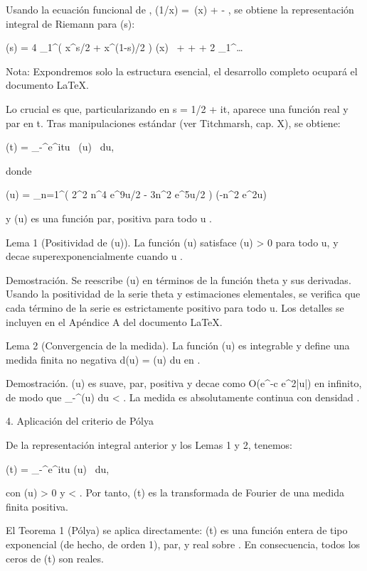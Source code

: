 \documentclass[12pt,a4paper]{book}
\begin{document}
Usando la ecuación funcional de \psi, \psi(1/x) = \,\psi(x) +  - , se obtiene la representación integral de Riemann para \xi(s):

\xi(s) = 4 \int_1^\infty \left( x^{s/2} + x^{(1-s)/2} \right) \psi(x) \,  +  +  + 2 \int_1^\infty \dots

Nota: Expondremos solo la estructura esencial, el desarrollo completo ocupará el documento LaTeX.

Lo crucial es que, particularizando en s = 1/2 + it, aparece una función real y par en t. Tras manipulaciones estándar (ver Titchmarsh, cap. X), se obtiene:

\Xi(t) =  \int_{-\infty}^\infty e^{itu} \, \Phi(u) \, du,
\]  

donde

\Phi(u) = \sum_{n=1}^\infty \left( 2\pi^2 n^4 e^{9u/2} - 3\pi n^2 e^{5u/2} \right) \exp(-\pi n^2 e^{2u})
\]  

y \Phi(u) es una función par, positiva para todo u \in {}.

Lema 1 (Positividad de \Phi(u)). La función \Phi(u) satisface \Phi(u) > 0 para todo u, y decae superexponencialmente cuando u \to \pm\infty.

Demostración. Se reescribe \Phi(u) en términos de la función theta y sus derivadas. Usando la positividad de la serie theta y estimaciones elementales, se verifica que cada término de la serie es estrictamente positivo para todo u. Los detalles se incluyen en el Apéndice A del documento LaTeX.

Lema 2 (Convergencia de la medida). La función \Phi(u) es integrable y define una medida finita no negativa d\nu(u) = \Phi(u) du en .

Demostración. \Phi(u) es suave, par, positiva y decae como O(e^{-c e^{2|u|}}) en infinito, de modo que \int_{-\infty}^\infty \Phi(u) du < \infty. La medida \nu es absolutamente continua con densidad \Phi.

4. Aplicación del criterio de Pólya

De la representación integral anterior y los Lemas 1 y 2, tenemos:

\Xi(t) =  \int_{-\infty}^\infty e^{itu} \Phi(u) \, du,
\]  

con \Phi(u) > 0 y \int \Phi < \infty. Por tanto, \Xi(t) es la transformada de Fourier de una medida finita positiva.

El Teorema 1 (Pólya) se aplica directamente: \Xi(t) es una función entera de tipo exponencial (de hecho, de orden 1), par, y real sobre . En consecuencia, todos los ceros de \Xi(t) son reales.
\end{document}
